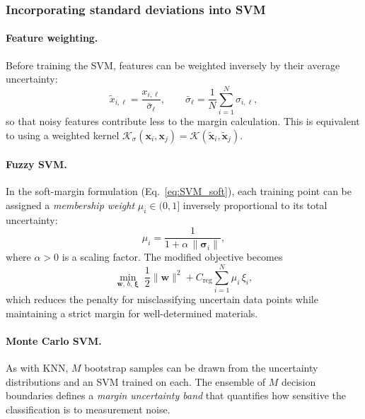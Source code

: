 \documentclass[12pt]{article}
\begin{document}
	\subsubsection{Incorporating standard deviations into SVM}

	\paragraph{Feature weighting.}
	Before training the SVM, features can be weighted inversely
	by their average uncertainty:
	\begin{equation}
		\tilde{x}_{i,\ell}
		= \frac{x_{i,\ell}}
		{\bar{\sigma}_\ell},
		\qquad
		\bar{\sigma}_\ell
		= \frac{1}{N}\sum_{i=1}^{N}\sigma_{i,\ell},
	\end{equation}
	so that noisy features contribute less to the margin
	calculation.  This is equivalent to using a weighted kernel
	$\mathcal{K}_\sigma(\mathbf{x}_i, \mathbf{x}_j)
	= \mathcal{K}(\tilde{\mathbf{x}}_i, \tilde{\mathbf{x}}_j)$.

	\paragraph{Fuzzy SVM.}
	In the soft-margin formulation
	(Eq.~\eqref{eq:SVM_soft}), each training point can be
	assigned a \emph{membership weight} $\mu_i \in (0,1]$
	inversely proportional to its total uncertainty:
	\begin{equation}
		\mu_i = \frac{1}{1 + \alpha\,\|\boldsymbol{\sigma}_i\|},
		\label{eq:fuzzy_weight}
	\end{equation}
	where $\alpha > 0$ is a scaling factor.  The modified
	objective becomes
	\begin{equation}
		\min_{\mathbf{w},\,b,\,\boldsymbol{\xi}}\;
		\frac{1}{2}\|\mathbf{w}\|^2
		+ C_{\mathrm{reg}}\sum_{i=1}^{N}\mu_i\,\xi_i,
		\label{eq:fuzzy_SVM}
	\end{equation}
	which reduces the penalty for misclassifying uncertain
	data points while maintaining a strict margin for
	well-determined materials.

	\paragraph{Monte Carlo SVM.}
	As with KNN, $M$ bootstrap samples can be drawn from the
	uncertainty distributions and an SVM trained on each.
	The ensemble of $M$ decision boundaries defines a
	\emph{margin uncertainty band} that quantifies how
	sensitive the classification is to measurement noise.
\end{document}
